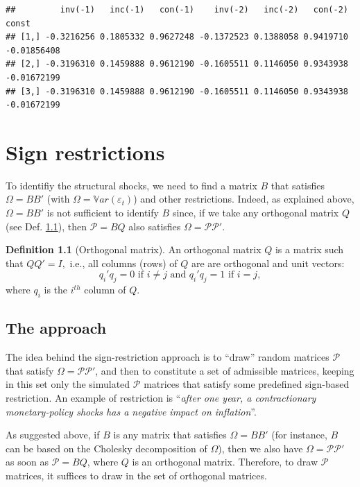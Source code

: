 \documentclass[
  12pt,
]{book}
\theoremstyle{definition}
\newtheorem{definition}{Definition}[chapter]
\theoremstyle{definition}
\theoremstyle{definition}
\theoremstyle{definition}
\theoremstyle{remark}
\begin{document}
\begin{verbatim}
##         inv(-1)   inc(-1)   con(-1)    inv(-2)   inc(-2)   con(-2)       const
## [1,] -0.3216256 0.1805332 0.9627248 -0.1372523 0.1388058 0.9419710 -0.01856408
## [2,] -0.3196310 0.1459888 0.9612190 -0.1605511 0.1146050 0.9343938 -0.01672199
## [3,] -0.3196310 0.1459888 0.9612190 -0.1605511 0.1146050 0.9343938 -0.01672199
\end{verbatim}

\chapter{Sign restrictions}\label{Signs}

To identifiy the structural shocks, we need to find a matrix \(B\) that satisfies \(\Omega = BB'\) (with \(\Omega = \mathbb{V}ar(\varepsilon_t)\)) and other restrictions. Indeed, as explained above, \(\Omega = BB'\) is not sufficient to identify \(B\) since, if we take any orthogonal matrix \(Q\) (see Def. \ref{def:orthogonal}), then \(\mathcal{P}=BQ\) also satisfies \(\Omega = \mathcal{P}\mathcal{P}'\).

\begin{definition}[Orthogonal matrix]
\protect\hypertarget{def:orthogonal}{}\label{def:orthogonal}An orthogonal matrix \(Q\) is a matrix such that \(QQ' = I,\) i.e., all columns (rows) of \(Q\) are are
orthogonal and unit vectors:
\[q_i'q_j=0\text{ if }i\neq j\text{ and }q_i'q_j=1\text{ if }i= j,\]
where \(q_i\) is the \(i^{th}\) column of \(Q\).
\end{definition}

\section{The approach}\label{the-approach}

The idea behind the sign-restriction approach is to ``draw'' random matrices \(\mathcal{P}\) that satisfy \(\Omega = \mathcal{P}\mathcal{P}'\), and then to constitute a set of admissible matrices, keeping in this set only the simulated \(\mathcal{P}\) matrices that satisfy some predefined sign-based restriction. An example of restriction is ``\emph{after one year, a contractionary monetary-policy shocks has a negative impact on inflation}''.

As suggested above, if \(B\) is any matrix that satisfies \(\Omega = BB'\) (for instance, \(B\) can be based on the Cholesky decomposition of \(\Omega\)), then we also have \(\Omega = \mathcal{P}\mathcal{P}'\) as soon as \(\mathcal{P}=BQ\), where \(Q\) is an orthogonal matrix. Therefore, to draw \(\mathcal{P}\) matrices, it suffices to draw in the set of orthogonal matrices.
\end{document}
